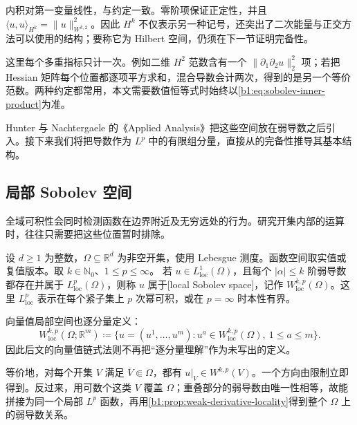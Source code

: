 内积对第一变量线性，与约定一致。零阶项保证正定性，并且 \(\langle u,u\rangle_{H^k}=\|u\|_{W^{k,2}}^2\)。因此 \(H^k\) 不仅表示另一种记号，还突出了二次能量与正交方法可以使用的结构；要称它为 Hilbert 空间，仍须在下一节证明完备性。

\ProseParagraphBreak

这里每个多重指标只计一次。例如二维 \(H^2\) 范数含有一个 \(\|\partial_1\partial_2u\|_2^2\) 项；若把 Hessian 矩阵每个位置都逐项平方求和，混合导数会计两次，得到的是另一个等价范数。两种约定都常用，本文需要数值恒等式时始终以\eqref{b1:eq:sobolev-inner-product}为准。

\ProseParagraphBreak

Hunter 与 Nachtergaele 的《Applied Analysis》\cite[Section 12.9, Definition 12.66 and the following discussion]{Hunter2001Applied}把这些空间放在弱导数之后引入。接下来我们将把导数作为 \(L^p\) 中的有限组分量，直接从的完备性推导其基本结构。

\subsection{局部 Sobolev 空间}
\label{b1:subsec:210104}

全域可积性会同时检测函数在边界附近及无穷远处的行为。研究开集内部的运算时，往往只需要把这些位置暂时排除。

\begin{definition}\label{b1:def:sobolev-local}
设 \(d\geq1\) 为整数，\(\Omega\subseteq\mathbb R^d\) 为非空开集，使用 Lebesgue 测度。函数空间取实值或复值版本。取 \(k\in\mathbb N_0\)、\(1\leq p\leq\infty\)。
若 \(u\in L^1_{\mathrm{loc}}(\Omega)\)，且每个 \(|\alpha|\le k\) 阶弱导数都存在并属于 \(L^p_{\mathrm{loc}}(\Omega)\)，则称 \(u\) 属于[local Sobolev space]，记作 \(W^{k,p}_{\mathrm{loc}}(\Omega)\)。这里 \(L^p_{\mathrm{loc}}\) 表示在每个紧子集上 \(p\) 次幂可积，或在 \(p=\infty\) 时本性有界。
\end{definition}

向量值局部空间也逐分量定义：
\[
 W^{k,p}_{\mathrm{loc}}(\Omega;\mathbb R^m)
 \coloneqq\bigl\{u=(u^1,\ldots,u^m):u^a\in W^{k,p}_{\mathrm{loc}}(\Omega),\ 1\leq a\leq m\bigr\}.
\]
因此后文的向量值链式法则不再把“逐分量理解”作为未写出的定义。

\ProseParagraphBreak

等价地，对每个开集 \(V\) 满足 \(\overline V\Subset\Omega\)，都有 \(u|_V\in W^{k,p}(V)\)。一个方向由限制立即得到。反过来，用可数个这类 \(V\) 覆盖 \(\Omega\)；重叠部分的弱导数由唯一性相等，故能拼接为同一个局部 \(L^p\) 函数，再用\cref{b1:prop:weak-derivative-locality}得到整个 \(\Omega\) 上的弱导数关系。

